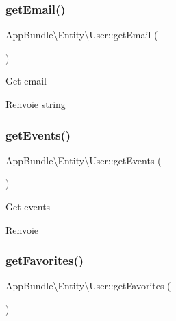 \subsubsection{\texorpdfstring{get\+Email()}{getEmail()}}
{\footnotesize\ttfamily App\+Bundle\textbackslash{}\+Entity\textbackslash{}\+User\+::get\+Email (\begin{DoxyParamCaption}{ }\end{DoxyParamCaption})}

Get email

\begin{DoxyReturn}{Renvoie}
string 
\end{DoxyReturn}
\mbox{\label{classAppBundle_1_1Entity_1_1User_a62fde34b4402150a87ac4fd1e2cd5131}} 
\subsubsection{\texorpdfstring{get\+Events()}{getEvents()}}
{\footnotesize\ttfamily App\+Bundle\textbackslash{}\+Entity\textbackslash{}\+User\+::get\+Events (\begin{DoxyParamCaption}{ }\end{DoxyParamCaption})}

Get events

\begin{DoxyReturn}{Renvoie}

\end{DoxyReturn}
\mbox{\label{classAppBundle_1_1Entity_1_1User_aa3edb74a8f3d7af87a13530706583967}} 
\subsubsection{\texorpdfstring{get\+Favorites()}{getFavorites()}}
{\footnotesize\ttfamily App\+Bundle\textbackslash{}\+Entity\textbackslash{}\+User\+::get\+Favorites (\begin{DoxyParamCaption}{ }\end{DoxyParamCaption})}

